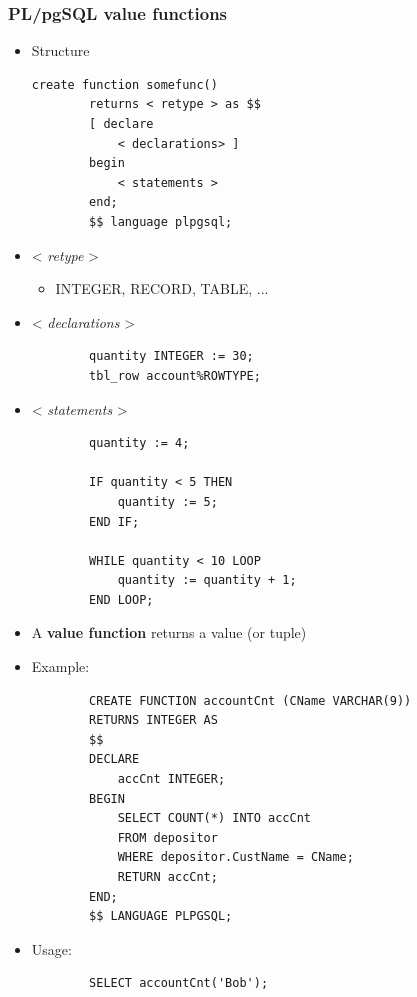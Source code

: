 \subsubsection{PL/pgSQL value functions}
\begin{itemize}
    \item Structure
    \begin{lstlisting}[]
        create function somefunc()
        returns < retype > as $$
        [ declare 
            < declarations> ]
        begin 
            < statements >
        end;
        $$ language plpgsql;
    \end{lstlisting}
    \item < \textit{retype} >
        \begin{itemize}
            \item INTEGER, RECORD, TABLE, ...
        \end{itemize}
    \item < \textit{declarations} >
    \begin{lstlisting}
        quantity INTEGER := 30;
        tbl_row account%ROWTYPE;
    \end{lstlisting}
    \item < \textit{statements} >
    \begin{lstlisting}
        quantity := 4;

        IF quantity < 5 THEN
            quantity := 5;
        END IF;

        WHILE quantity < 10 LOOP
            quantity := quantity + 1;
        END LOOP;     
    \end{lstlisting}
    \item A \textbf{value function} returns a value (or tuple) 
    \item Example:
    \begin{lstlisting}
        CREATE FUNCTION accountCnt (CName VARCHAR(9))
        RETURNS INTEGER AS
        $$
        DECLARE
            accCnt INTEGER;
        BEGIN 
            SELECT COUNT(*) INTO accCnt
            FROM depositor
            WHERE depositor.CustName = CName;
            RETURN accCnt;
        END;
        $$ LANGUAGE PLPGSQL;
    \end{lstlisting}
    \item Usage: \begin{lstlisting}
        SELECT accountCnt('Bob');
    \end{lstlisting}
\end{itemize}


